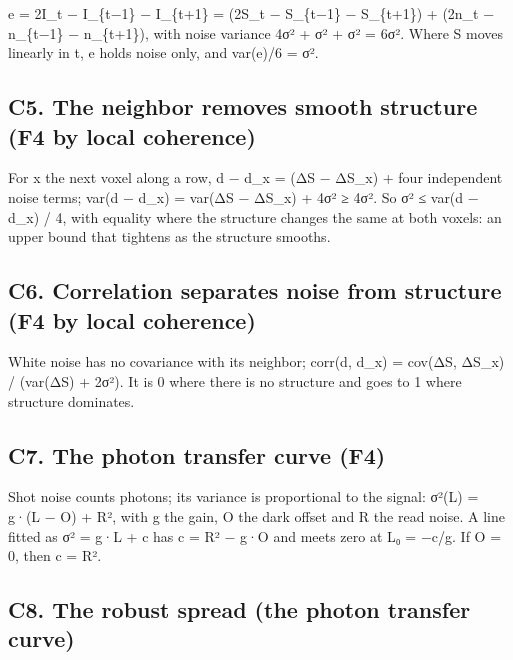 e = 2I\_\allowbreak{}t − I\_\allowbreak{}\{t−1\} − I\_\allowbreak{}\{t+1\} = (2S\_\allowbreak{}t − S\_\allowbreak{}\{t−1\} − S\_\allowbreak{}\{t+1\}) + (2n\_\allowbreak{}t − n\_\allowbreak{}\{t−1\} − n\_\allowbreak{}\{t+1\}), with noise variance 4σ² + σ² + σ² = 6σ². Where S moves linearly in t, e holds noise only, and var(e)/6 = σ².

\subsection{\texorpdfstring{C5. The neighbor removes smooth structure (F4 by local coherence)}{C5. The neighbor removes smooth structure (F4 by local coherence)}}

For x the next voxel along a row, d − d\_\allowbreak{}x = (ΔS − ΔS\_\allowbreak{}x) + four independent noise terms; var(d − d\_\allowbreak{}x) = var(ΔS − ΔS\_\allowbreak{}x) + 4σ² ≥ 4σ². So σ² ≤ var(d − d\_\allowbreak{}x) / 4, with equality where the structure changes the same at both voxels: an upper bound that tightens as the structure smooths.

\subsection{\texorpdfstring{C6. Correlation separates noise from structure (F4 by local coherence)}{C6. Correlation separates noise from structure (F4 by local coherence)}}

White noise has no covariance with its neighbor; corr(d, d\_\allowbreak{}x) = cov(ΔS, ΔS\_\allowbreak{}x) / (var(ΔS) + 2σ²). It is 0 where there is no structure and goes to 1 where structure dominates.

\subsection{\texorpdfstring{C7. The photon transfer curve (F4)}{C7. The photon transfer curve (F4)}}

Shot noise counts photons; its variance is proportional to the signal: σ²(L) = g·(L − O) + R², with g the gain, O the dark offset and R the read noise. A line fitted as σ² = g·L + c has c = R² − g·O and meets zero at L₀ = −c/g. If O = 0, then c = R².

\subsection{\texorpdfstring{C8. The robust spread (the photon transfer curve)}{C8. The robust spread (the photon transfer curve)}}

